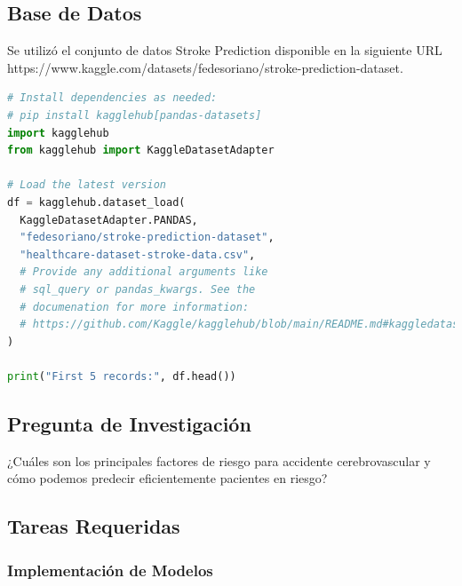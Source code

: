\documentclass[12pt,a4paper]{article}
\begin{document}
\subsection{Base de Datos}

Se utilizó el conjunto de datos Stroke Prediction disponible en la siguiente URL https://www.kaggle.com/datasets/fedesoriano/stroke-prediction-dataset.

\begin{lstlisting}[language=Python, frame=single, basicstyle=\ttfamily\small, breaklines=true]
# Install dependencies as needed:
# pip install kagglehub[pandas-datasets]
import kagglehub
from kagglehub import KaggleDatasetAdapter

# Load the latest version
df = kagglehub.dataset_load(
  KaggleDatasetAdapter.PANDAS,
  "fedesoriano/stroke-prediction-dataset",
  "healthcare-dataset-stroke-data.csv",
  # Provide any additional arguments like 
  # sql_query or pandas_kwargs. See the 
  # documenation for more information:
  # https://github.com/Kaggle/kagglehub/blob/main/README.md#kaggledatasetadapterpandas
)

print("First 5 records:", df.head())
\end{lstlisting}

\subsection{Pregunta de Investigación}

¿Cuáles son los principales factores de riesgo para accidente cerebrovascular y cómo podemos predecir
eficientemente pacientes en riesgo?

\subsection{Tareas Requeridas}

\subsubsection{Implementación de Modelos}
\end{document}

